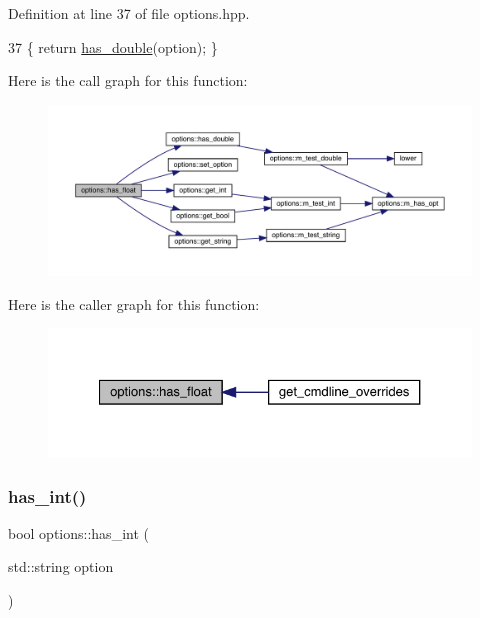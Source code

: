 Definition at line 37 of file options.\+hpp.


\begin{DoxyCode}
37 \{ \textcolor{keywordflow}{return} \hyperlink{classoptions_ab66aae6c79cdde8dd38d0d3fc8aa3de5}{has\_double}(option); \}
\end{DoxyCode}
Here is the call graph for this function\+:\nopagebreak
\begin{figure}[H]
\begin{center}
\leavevmode
\includegraphics[width=350pt]{classoptions_ae6f1f714c9ad1dc01cb5509df0c4c838_cgraph}
\end{center}
\end{figure}
Here is the caller graph for this function\+:\nopagebreak
\begin{figure}[H]
\begin{center}
\leavevmode
\includegraphics[width=327pt]{classoptions_ae6f1f714c9ad1dc01cb5509df0c4c838_icgraph}
\end{center}
\end{figure}
\mbox{\label{classoptions_a01020aa5bd82bcff1b1c950b20578883}} 
\subsubsection{\texorpdfstring{has\+\_\+int()}{has\_int()}}
{\footnotesize\ttfamily bool options\+::has\+\_\+int (\begin{DoxyParamCaption}\item[{std\+::string}]{option }\end{DoxyParamCaption})}

